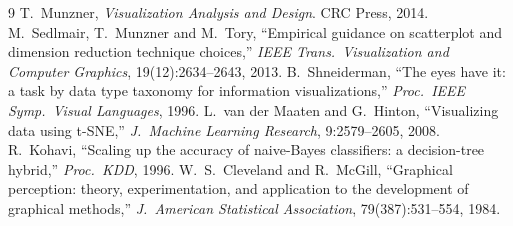 \documentclass[11pt,a4paper]{article}
\begin{document}
\begin{thebibliography}{9}
 T.~Munzner, \emph{Visualization Analysis and Design}.
CRC Press, 2014.
 M.~Sedlmair, T.~Munzner and M.~Tory,
``Empirical guidance on scatterplot and dimension reduction technique
choices,'' \emph{IEEE Trans.\ Visualization and Computer Graphics},
19(12):2634--2643, 2013.
 B.~Shneiderman, ``The eyes have it: a task by data
type taxonomy for information visualizations,'' \emph{Proc.\ IEEE Symp.\
Visual Languages}, 1996.
 L.~van der Maaten and G.~Hinton, ``Visualizing data
using t-SNE,'' \emph{J.\ Machine Learning Research}, 9:2579--2605, 2008.
\bibitem{kohavi} R.~Kohavi, ``Scaling up the accuracy of naive-Bayes
classifiers: a decision-tree hybrid,'' \emph{Proc.\ KDD}, 1996.
 W.~S.~Cleveland and R.~McGill, ``Graphical perception:
theory, experimentation, and application to the development of graphical
methods,'' \emph{J.\ American Statistical Association}, 79(387):531--554,
1984.
\end{thebibliography}
\end{document}
